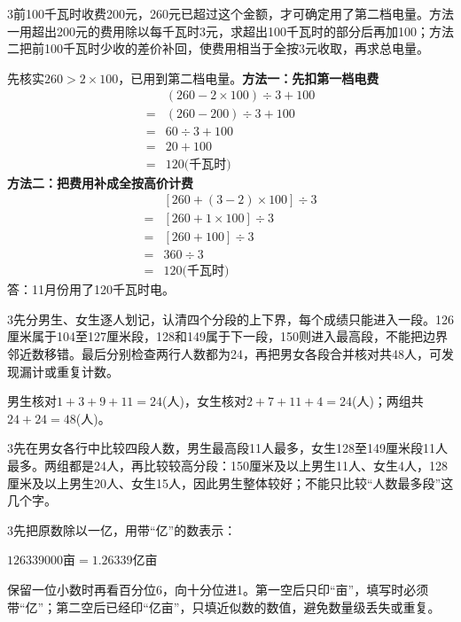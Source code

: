 \documentclass[multi=snippet,border={5bp 20bp 5bp 5bp}]{standalone}
\newenvironment{snippet}[3]{\begin{minipage}{#1bp}\color{answerred}\fontsize{#2}{#3}\selectfont\raggedright}{\end{minipage}}
\begin{document}
\begin{snippet}{505}{11.5}{14}\begin{multicols}{3}\raggedcolumns 前100千瓦时收费200元，260元已超过这个金额，才可确定用了第二档电量。方法一用超出200元的费用除以每千瓦时3元，求超出100千瓦时的部分后再加100；方法二把前100千瓦时少收的差价补回，使费用相当于全按3元收取，再求总电量。\par 先核实\(260>2\times100\)\allowbreak ，已用到第二档电量。\textbf{方法一：先扣第一档电费}\[\begin{aligned} &(260-2\times100)\div3+100\\={}&(260-200)\div3+100\\={}&60\div3+100\\={}&20+100\\={}&120\text{(千瓦时)}\end{aligned}\]\textbf{方法二：把费用补成全按高价计费}\[\begin{aligned} &[260+(3-2)\times100]\div3\\={}&[260+1\times100]\div3\\={}&[260+100]\div3\\={}&360\div3\\={}&120\text{(千瓦时)}\end{aligned}\]答：11月份用了120千瓦时电。\end{multicols}\end{snippet}
\begin{snippet}{505}{11.5}{14}\begin{multicols}{3}\raggedcolumns 先分男生、女生逐人划记，认清四个分段的上下界，每个成绩只能进入一段。126厘米属于104至127厘米段，128和149属于下一段，150则进入最高段，不能把边界邻近数移错。最后分别检查两行人数都为24，再把男女各段合并核对共48人，可发现漏计或重复计数。\par 男生核对\(1+3+9+11=24\)\allowbreak (人)，女生核对\(2+7+11+4=24\)\allowbreak (人)；两组共\(24+24=48\)\allowbreak (人)。\end{multicols}\end{snippet}
\begin{snippet}{505}{11.5}{14}\begin{multicols}{3}\raggedcolumns 先在男女各行中比较四段人数，男生最高段11人最多，女生128至149厘米段11人最多。两组都是24人，再比较较高分段：150厘米及以上男生11人、女生4人，128厘米及以上男生20人、女生15人，因此男生整体较好；不能只比较“人数最多段”这几个字。\end{multicols}\end{snippet}
\begin{snippet}{505}{11.5}{14}\begin{multicols}{3}\raggedcolumns 先把原数除以一亿，用带“亿”的数表示：\par\noindent\(\displaystyle 126339000\text{亩}=1.26339\text{亿亩}\)\allowbreak \par 保留一位小数时再看百分位6，向十分位进1。第一空后只印“亩”，填写时必须带“亿”；第二空后已经印“亿亩”，只填近似数的数值，避免数量级丢失或重复。\end{multicols}\end{snippet}
\end{document}
